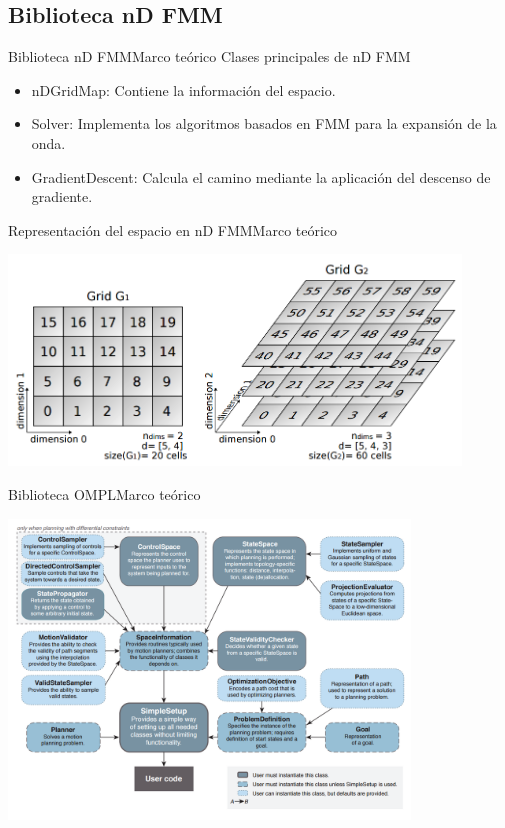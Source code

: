 \documentclass[10pt]{beamer}
\begin{document}
\subsection{Biblioteca nD FMM}
\begin{frame}{Biblioteca nD FMM}{Marco teórico}
	\vspace{1cm}
	Clases principales de nD FMM
	\vspace{0.5cm}
	\begin{itemize}
		\item nDGridMap: Contiene la información del espacio.
		\item Solver: Implementa los algoritmos basados en FMM para la expansión de la onda.
		\item GradientDescent: Calcula el camino mediante la aplicación del descenso de gradiente.
	\end{itemize}
\end{frame}

\begin{frame}{Representación del espacio en nD FMM}{Marco teórico}
	\begin{center}	
	\includegraphics[width=0.9\textwidth,height=0.8\textheight,keepaspectratio]{grid1}	
	\end{center}
\end{frame}

\begin{frame}{Biblioteca OMPL}{Marco teórico}
 \vspace{0.5cm}
	\begin{center}	
		\includegraphics[width=0.8\textwidth,height=0.8\textheight,keepaspectratio]{OMPL1}	
	\end{center}
\end{frame}
\end{document}
